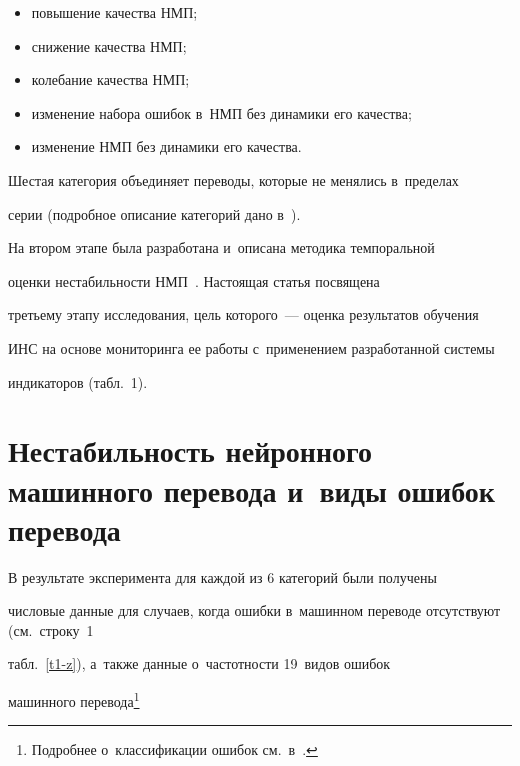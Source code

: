    \begin{itemize}


   \item повышение качества НМП;


   \item снижение качества НМП;


   \item колебание качества НМП;


   \item изменение набора ошибок в~НМП без динамики его качества;


   \item изменение НМП без динамики его качества.


   \end{itemize}


   


   Шестая категория объединяет переводы, которые не менялись в~пределах 


серии (подробное описание категорий дано в~\cite{12-z}).


   


   На втором этапе была разработана и~описана методика темпоральной 


оценки нестабильности НМП~\cite{13-z}. Настоящая статья посвящена 


третьему этапу исследования, цель которого~--- оценка результатов обучения 


ИНС на основе мониторинга ее работы с~применением разработанной системы 


индикаторов (табл.~1).


   


\section{Нестабильность нейронного машинного перевода и~виды ошибок перевода}





   В результате эксперимента для каждой из 6 категорий были получены 


числовые данные для случаев, когда ошибки в~машинном переводе отсутствуют (см.\ строку~1 


табл.~\ref{t1-z}), а~также данные о~частотности 19~видов ошибок 


машинного перевода\footnote{Подробнее о~классификации ошибок см.\ в~\cite{12-z, 13-z}.} 


